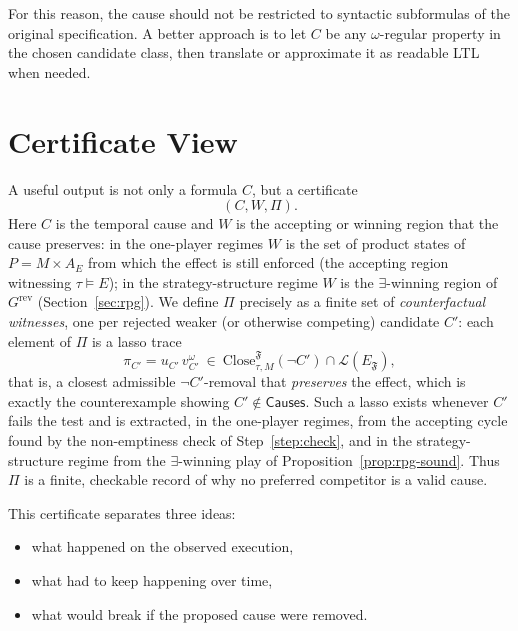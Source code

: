 \documentclass[11pt]{article}
\theoremstyle{remark}
\newcommand{\Close}{\mathrm{Close}}
\newcommand{\Lang}{\mathcal{L}}
\newcommand{\Frame}{\mathfrak{F}}
\begin{document}
For this reason, the cause should not be restricted to syntactic subformulas of
the original specification. A better approach is to let \(C\) be any
\(\omega\)-regular property in the chosen candidate class, then translate or
approximate it as readable LTL when needed.

\section{Certificate View}
\label{sec:certificate}

A useful output is not only a formula \(C\), but a certificate
\[
  (C,W,\Pi).
\]
Here \(C\) is the temporal cause and \(W\) is the accepting or winning region
that the cause preserves: in the one-player regimes \(W\) is the set of product
states of \(P=M\times A_E\) from which the effect is still enforced (the accepting
region witnessing \(\tau\models E\)); in the strategy-structure regime \(W\) is
the \(\exists\)-winning region of \(G^{\mathrm{rev}}\) (Section~\ref{sec:rpg}). We
define \(\Pi\) precisely as a finite set of \emph{counterfactual witnesses}, one
per rejected weaker (or otherwise competing) candidate \(C'\): each element of
\(\Pi\) is a lasso trace
\[
  \pi_{C'}=u_{C'}\,v_{C'}^{\omega}\ \in\
  \Close_{\tau,M}^{\Frame}(\neg C')\cap\Lang(E_{\Frame}),
\]
that is, a closest admissible \(\neg C'\)-removal that \emph{preserves} the
effect, which is exactly the counterexample showing \(C'\notin\mathsf{Causes}\).
Such a lasso exists whenever \(C'\) fails the test and is extracted, in the
one-player regimes, from the accepting cycle found by the non-emptiness check of
Step~\ref{step:check}, and in the strategy-structure regime from the
\(\exists\)-winning play of Proposition~\ref{prop:rpg-sound}. Thus \(\Pi\) is a
finite, checkable record of why no preferred competitor is a valid cause.

This certificate separates three ideas:
\begin{itemize}
  \item what happened on the observed execution,
  \item what had to keep happening over time,
  \item what would break if the proposed cause were removed.
\end{itemize}
\end{document}
